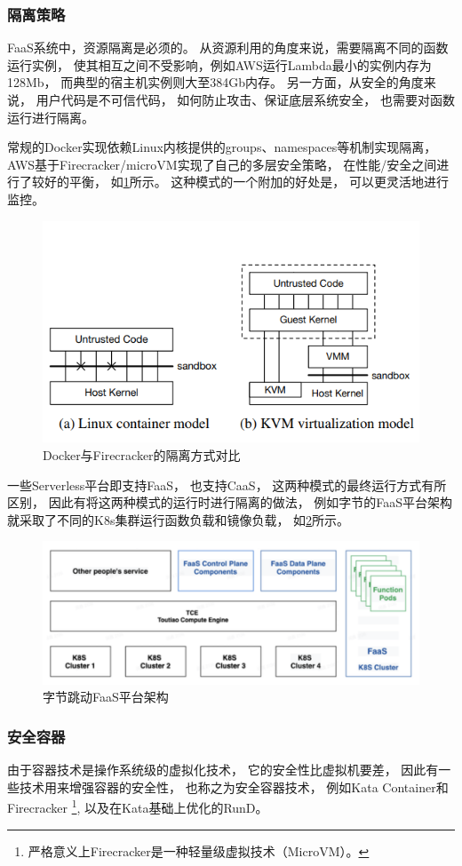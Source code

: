 \subsubsection{隔离策略}
FaaS系统中，资源隔离是必须的。
从资源利用的角度来说，需要隔离不同的函数运行实例，
使其相互之间不受影响，例如AWS运行Lambda最小的实例内存为128Mb，
而典型的宿主机实例则大至384Gb内存。
另一方面，从安全的角度来说，
用户代码是不可信代码，
如何防止攻击、保证底层系统安全，
也需要对函数运行进行隔离。

常规的Docker实现依赖Linux内核提供的groups、namespaces等机制实现隔离，
AWS基于Firecracker/microVM实现了自己的多层安全策略，
在性能/安全之间进行了较好的平衡，
如\cref{firecracker_isolation_model}所示\cite{Agache2020, aws_2020_function_isolation}。
这种模式的一个附加的好处是，
可以更灵活地进行监控。

\begin{figure}[ht!]
    \centering
    \includegraphics[width=0.7\linewidth]{images/firecrack-isolation.png}
    \caption{Docker与Firecracker的隔离方式对比\cite{Agache2020}}
    \label{firecracker_isolation_model}
\end{figure}

一些Serverless平台即支持FaaS，
也支持CaaS，
这两种模式的最终运行方式有所区别，
因此有将这两种模式的运行时进行隔离的做法，
例如字节的FaaS平台架构就采取了不同的K8s集群运行函数负载和镜像负载，
如\cref{bytedance_faas_arch}所示。

\begin{figure}[ht!]
    \centering
    \includegraphics[width=0.7\linewidth]{images/bytedance_faas_arch.png}
    \caption{字节跳动FaaS平台架构\cite{bytedance_faas}}
    \label{bytedance_faas_arch}
\end{figure}

\subsubsection{安全容器}
由于容器技术是操作系统级的虚拟化技术，
它的安全性比虚拟机要差，
因此有一些技术用来增强容器的安全性，
也称之为安全容器技术，
例如Kata Container和Firecracker
\footnote{严格意义上Firecracker是一种轻量级虚拟技术（MicroVM）。},
以及在Kata基础上优化的RunD\cite{rund}。
